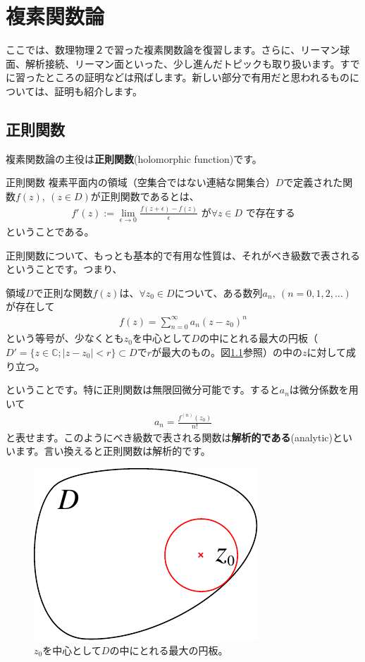 \documentclass[report,paper=a4, fontsize=12pt, line_length=16cm, number_of_lines=33,dvipdfmx]{jlreq}
\numberwithin{equation}{section}
\newcommand{\Cb}{\mathbb{C}}
\newcommand{\strong}[1]{\textsf{\bfseries #1}}
\begin{document}
\chapter{複素関数論}\label{ch:complexanalysis}
ここでは、数理物理２で習った複素関数論を復習します。さらに、リーマン球面、解析接続、リーマン面といった、少し進んだトピックも取り扱います。すでに習ったところの証明などは飛ばします。新しい部分で有用だと思われるものについては、証明も紹介します。

\section{正則関数}
複素関数論の主役は\strong{正則関数}(holomorphic function)です。
\begin{definition}{正則関数}{}
  複素平面内の領域（空集合ではない連結な開集合）$D$で定義された関数$f(z),\ (z\in D)$が正則関数であるとは、
  \begin{align}
    f'(z):=\lim_{\epsilon\to 0}\frac{f(z+\epsilon)-f(z)}{\epsilon} \text{ が}\forall z \in D \text{ で存在する}
  \end{align}
  ということである。    
\end{definition}

正則関数について、もっとも基本的で有用な性質は、それがべき級数で表されるということです。つまり、
\begin{theor}{}{}
  領域$D$で正則な関数$f(z)$は、$\forall z_0 \in D$について、ある数列$a_n,\ (n=0,1,2,\dots)$が存在して
  \begin{align}
    f(z)=\sum_{n=0}^{\infty}a_n (z-z_0)^n \label{powerseries}
  \end{align}
  という等号が、少なくとも$z_0$を中心として$D$の中にとれる最大の円板（$D'=\{z\in \Cb ; |z-z_0|<r\}\subset D$で$r$が最大のもの。図\ref{fig:maxdisk}参照）の中の$z$に対して成り立つ。  
\end{theor}
ということです。特に正則関数は無限回微分可能です。すると$a_n$は微分係数を用いて
\begin{align}
  a_n=\frac{f^{(n)}(z_0)}{n!}
\end{align}
と表せます。このようにべき級数で表される関数は\strong{解析的である}(analytic)といいます。言い換えると正則関数は解析的です。
\begin{figure}[htbp]
  \centering
  \includegraphics{maxdisk.pdf}
  \caption{$z_0$を中心として$D$の中にとれる最大の円板。}
  \label{fig:maxdisk}
\end{figure}
\end{document}
